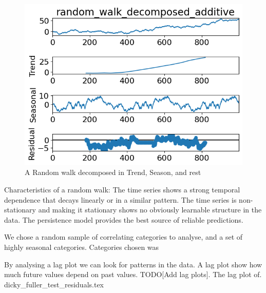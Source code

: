\begin{figure}[h!]
  \centering
  \includegraphics[width=\textwidth]{./figs/code_generated/data_exploration/random_walk_decomposed_additive.png}
  \hfill
  \caption{A Random walk decomposed in Trend, Season, and rest}
  \label{fig:dataset:random_walk_decomposed}
\end{figure}


Characteristics of a random walk:
The time series shows a strong temporal dependence that decays linearly or in a similar pattern.
The time series is non-stationary and making it stationary shows no obviously learnable structure in the data.
The persistence model provides the best source of reliable predictions.

We chose a random sample of correlating categories to analyse,
and a set of highly seasonal categories.
Categories chosen was
%



By analysing a lag plot we can look for patterns in the data. A lag plot
show how much future values depend on past values.
TODO[Add lag plots].
The lag plot of.
{dicky_fuller_test_residuals.tex}

